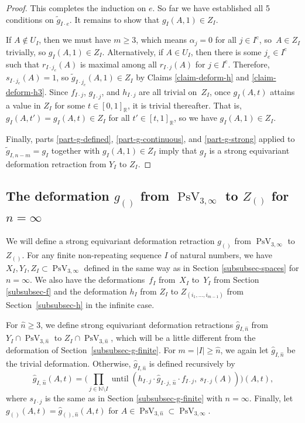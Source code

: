 \documentclass[11pt]{article}
\numberwithin{equation}{section}
\theoremstyle{remark}
\let\mb\mathbb
\newcommand{\compl}[1]{{{#1}^{\text{c}}}}
\DeclareMathOperator{\pstief}{PsV}
\DeclareMathOperator{\upto}{until}
\begin{document}
\begin{proof}
This completes the induction on $e$.
So far we have established all 5 conditions on $\tilde g_{I\cdot e}$.
It remains to show that $g_I(A,1) \in Z_I$.

If $A \not\in U_I$, then we must have $m \geq 3$, which means $\alpha_j = 0$ for all $j \in \compl{I}$, so~$A \in Z_I$ trivially, so $g_I(A,1) \in Z_I$.
Alternatively, if $A \in U_I$, then there is some $j_e \in \compl{I}$ such that $r_{I\cdot j_e}(A)$ is maximal among all $r_{I\cdot j}(A)$ for $j \in \compl{I}$.
Therefore, $s_{I\cdot j_e}(A) = 1$, so $\tilde g_{I\cdot j_e}(A,1) \in Z_I$ by Claims \ref{claim-deform-h} and \ref{claim-deform-h3}. Since $f_{I\cdot j}$, $g_{I\cdot j}$, and $h_{I\cdot j}$ are all trivial on~$Z_I$, once $g_I(A,t)$ attains a value in $Z_I$ for some $t \in [0,1]_\mb{R}$, it is trivial thereafter. That is, $g_I(A,t') = g_I(A,t) \in Z_I$ for all $t' \in [t,1]_\mb{R}$, so we have $g_I(A,1) \in Z_I$.

Finally, parts \eqref{part-g-defined}, \eqref{part-g-continuous}, and \eqref{part-g-strong} applied to $\tilde g_{I,n-m} = g_I$ together with $g_I(A,1) \in Z_I$ imply that $g_I$ is a strong equivariant deformation retraction from $Y_I$ to $Z_I$.
\end{proof}

\subsection{The deformation $g_{()}$ from $\pstief_{3,\infty}$ to $Z_{()}$ for $n = \infty$}
\label{subsubsec-g-infinite}

We will define a strong equivariant deformation retraction $g_{()}$ from $\pstief_{3,\infty}$ to $Z_{()}$.
For any finite non-repeating sequence $I$ of natural numbers, we have $X_I,Y_I,Z_I \subset \pstief_{3,\infty}$ defined in the same way as in Section \ref{subsubsec-spaces} for $n = \infty$.
We also have the deformations~$f_I$ from~$X_I$ to~$Y_I$ from Section \ref{subsubsec-f} and the deformation $h_I$ from $Z_{I}$ to $Z_{(i_1,\dots,i_{m-1})}$ from Section~\ref{subsubsec-h} in the infinite case.

For $\hat n \geq 3$, we define strong equivariant deformation retractions $\hat g_{I,\hat n}$ from \hbox{$Y_I \cap \pstief_{3,\hat n}$} to $Z_I \cap \pstief_{3,\hat n}$, which will be a little different from the deformation of Section~\ref{subsubsec-g-finite}.
For $m = |I| \geq \hat n$, we again let $\hat g_{I,\hat n}$ be the trivial deformation. Otherwise, $\hat g_{I,\hat n}$ is defined recursively by
\begin{equation}\label{equation-g-infty}
\hat g_{I,\, \hat n}({A},t) = \biggl( \prod_{j \in \mb{N} \setminus I } \upto\left(h_{I \cdot j} \cdot \hat g_{I \cdot j,\, \hat n} \cdot f_{I \cdot j},\ s_{I \cdot j} ({A}) \right)\biggr) ({A},t),
\end{equation}
where $s_{I\cdot j}$ is the same as in Section \ref{subsubsec-g-finite} with $n = \infty$.
Finally, let $g_{()}(A,t) = \hat g_{(),\hat n}(A,t)$ for $A \in \pstief_{3,\hat n} \subset \pstief_{3,\infty}$.
\end{document}
